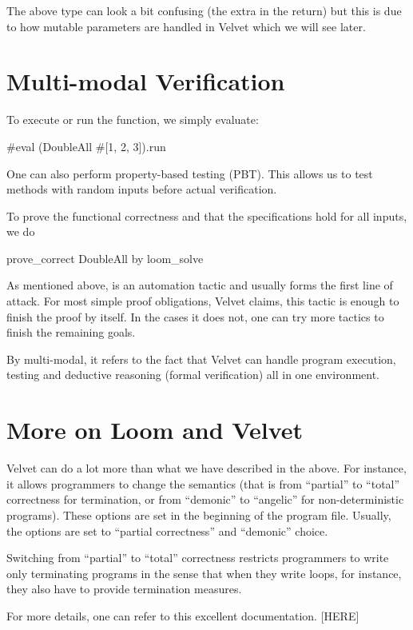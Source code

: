 The above type can look a bit confusing (the extra  in the return)
but this is due to how mutable parameters are handled in Velvet which we will
see later.

\section{Multi-modal Verification}

To execute or run the function, we simply evaluate:

\begin{leanblock}
#eval (DoubleAll #[1, 2, 3]).run
\end{leanblock}

One can also perform property-based testing (PBT). This allows us to test
methods with random inputs before actual verification.

To prove the functional correctness and that the specifications hold for all
inputs, we do

\begin{leanblock}
prove_correct DoubleAll
  by loom_solve
\end{leanblock}

As mentioned above,  is an automation tactic and usually forms
the first line of attack. For most simple proof obligations, Velvet claims, this
tactic is enough to finish the proof by itself. In the cases it does not, one
can try more tactics to finish the remaining goals.

By multi-modal, it refers to the fact that Velvet can handle program execution,
testing and deductive reasoning (formal verification) all in one environment.

\section{More on Loom and Velvet}

Velvet can do a lot more than what we have described in the above. For instance,
it allows programmers to change the semantics (that is from ``partial'' to
``total'' correctness for termination, or from ``demonic'' to ``angelic'' for
non-deterministic programs). These options are set in the beginning of the
program file. Usually, the options are set to ``partial correctness'' and
``demonic'' choice.

Switching from ``partial'' to ``total'' correctness restricts programmers to
write only terminating programs in the sense that when they write loops, for
instance, they also have to provide termination measures.

For more details, one can refer to this excellent documentation. [HERE]

